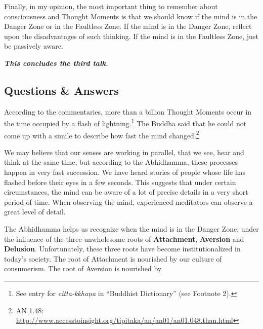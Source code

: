 Finally, in my opinion, the most important thing to remember about consciousness and Thought Moments is that we should know if the mind is in the Danger Zone or in the Faultless Zone. If the mind is in the Danger Zone, reflect upon the disadvantages of such thinking. If the mind is in the Faultless Zone, just be passively aware.

\begin{center}
\textbf{\textit{This concludes the third talk.}} \\
\end{center}

\newpage

\subsection*{Questions \& Answers}
\color {red}


According to the commentaries, more than a billion Thought Moments occur in the time occupied by a flash of lightning.\footnote{See entry for \textit{citta-kkhaṇa} in “Buddhist Dictionary” (see Footnote 2).} The Buddha said that he could not come up with a simile to describe how fast the mind changed.\footnote{AN 1.48: \url{http://www.accesstoinsight.org/tipitaka/an/an01/an01.048.than.html}}

We may believe that our senses are working in parallel, that we see, hear and think at the same time, but according to the Abhidhamma, these processes happen in very fast succession. We have heard stories of people whose life has flashed before their eyes in a few seconds. This suggests that under certain circumstances, the mind can be aware of a lot of precise details in a very short period of time. When observing the mind, experienced meditators can observe a great level of detail.


The Abhidhamma helps us recognize when the mind is in the Danger Zone, under the influence of the three unwholesome roots of \textbf{Attachment}, \textbf{Aversion} and \textbf{Delusion}. Unfortunately, these three roots have become institutionalized in today's society. The root of Attachment is nourished by our culture of consumerism. The root of Aversion is nourished by 

\color {black}


